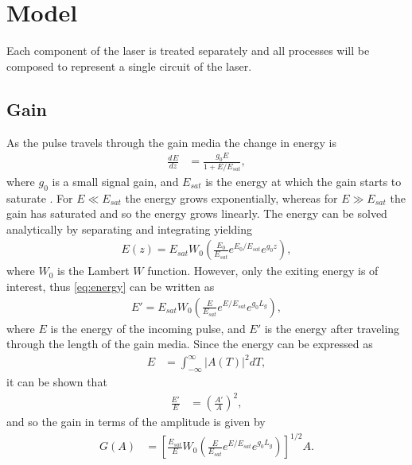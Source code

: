 \documentclass[12pt]{article}
\title{}
\author{Brady Metherall}
\newcommand{\diff}[3][]{\frac{d^{#1}#2}{d{#3}^{#1}}}
\newcommand{\Es}{E_{sat}}
\begin{document}
\maketitle

\section{Model}
Each component of the laser is treated separately and all processes will be composed to represent a single circuit of the laser.

\subsection{Gain}
As the pulse travels through the gain media the change in energy is
\begin{align*}
\diff{E}{z} &= \frac{g_0 E}{1 + E / \Es},
\end{align*}
where $g_0$ is a small signal gain, and $E_{sat}$ is the energy at which the gain starts to saturate \cite{silfvast}. For $E \ll \Es$ the energy grows exponentially, whereas for $E \gg \Es$ the gain has saturated and so the energy grows linearly. The energy can be solved analytically by separating and integrating yielding
\begin{align}
\label{eq:energy}
E(z) = \Es W_0 \left( \frac{E_0}{\Es} e^{E_0 / \Es} e^{g_0 z} \right),
\end{align}
where $W_0$ is the Lambert $W$ function. However, only the exiting energy is of interest, thus \eqref{eq:energy} can be written as
\begin{align*}
E' = \Es W_0 \left( \frac{E}{\Es} e^{E / \Es} e^{g_0 L_g} \right),
\end{align*}
where $E$ is the energy of the incoming pulse, and $E'$ is the energy after traveling through the length of the gain media. Since the energy can be expressed as
\begin{align*}
E &= \int_{-\infty}^{\infty} |A(T)|^2 dT,
\end{align*}
it can be shown that
\begin{align*}
\frac{E'}{E} &= \left( \frac{A'}{A} \right)^2,
\end{align*}
and so the gain in terms of the amplitude is given by
\begin{align}
\label{eq:gain}
G(A) &= \left[ \frac{\Es}{E} W_0 \left( \frac{E}{\Es} e^{E / \Es} e^{g_0 L_g} \right) \right]^{1/2} A.
\end{align}
\end{document}
